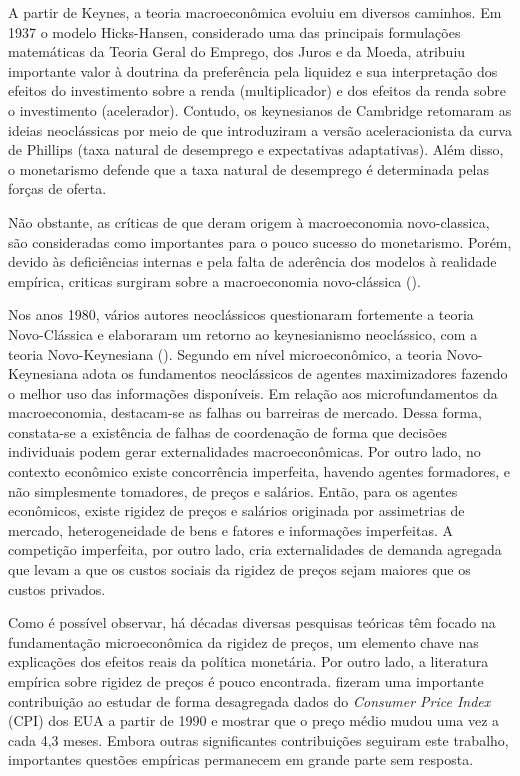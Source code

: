 \documentclass[twoside,a4paper,11pt]{report}
\begin{document}
A partir de Keynes, a teoria macroeconômica evoluiu em diversos caminhos. Em 1937 o modelo Hicks-Hansen, considerado uma das principais formulações matemáticas da Teoria Geral do Emprego, dos Juros e da Moeda, atribuiu importante valor à doutrina da preferência pela liquidez e sua interpretação dos efeitos do investimento sobre a renda (multiplicador) e dos efeitos da renda sobre o investimento (acelerador). Contudo, os keynesianos de Cambridge retomaram as ideias neoclássicas por meio de \citet{friedman1992money} que introduziram a versão aceleracionista da curva de Phillips (taxa natural de desemprego e expectativas adaptativas). Além disso, o monetarismo defende que a taxa natural de desemprego é determinada pelas forças de oferta. 

Não obstante, as críticas de \citet{lucas1972expectations} que deram origem à macroeconomia novo-classica, são consideradas como importantes para o pouco sucesso do monetarismo.  Porém, devido às deficiências internas e pela falta de aderência dos modelos à realidade empírica, criticas surgiram sobre a macroeconomia novo-clássica (\citet{mccallum1998stickiness}).

Nos anos 1980, vários autores neoclássicos  questionaram fortemente a teoria Novo-Clássica e elaboraram um retorno ao keynesianismo neoclássico, com a teoria Novo-Keynesiana (\citet{blinder1983money}). Segundo \citet{dathein2000crescimento} em nível microeconômico, a teoria Novo-Keynesiana adota os fundamentos neoclássicos de agentes maximizadores fazendo o melhor uso das informações disponíveis. Em relação aos microfundamentos da macroeconomia, destacam-se as falhas ou barreiras de mercado. Dessa forma, constata-se a existência de falhas de coordenação de forma que decisões individuais podem gerar externalidades macroeconômicas. Por outro lado, no contexto econômico existe concorrência imperfeita, havendo agentes formadores, e não simplesmente tomadores, de preços e salários. Então, para os agentes econômicos, existe rigidez de preços e salários originada por assimetrias de mercado, heterogeneidade de bens e fatores e informações imperfeitas. A competição imperfeita, por outro lado, cria externalidades de demanda agregada que levam a que os custos sociais da rigidez de preços sejam maiores que os custos privados. 

Como é possível observar, há décadas diversas pesquisas teóricas têm focado na fundamentação microeconômica da rigidez de preços, um elemento chave nas explicações dos efeitos reais da política monetária. Por outro lado, a literatura empírica sobre rigidez de preços é pouco encontrada. \citet{bils2004some} fizeram uma importante contribuição ao estudar de forma desagregada dados do \emph{Consumer Price Index} (CPI) dos EUA a partir de 1990 e mostrar que o preço médio mudou uma vez a cada 4,3 meses. Embora outras significantes contribuições seguiram este trabalho, importantes questões empíricas permanecem em grande parte sem resposta.
\end{document}
